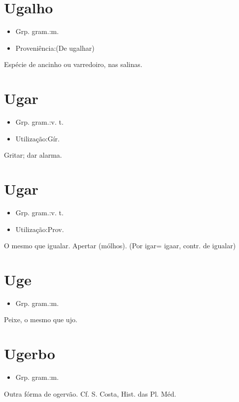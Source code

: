 \documentclass{article}
\begin{document}
\section{Ugalho}
\begin{itemize}
\item {Grp. gram.:m.}
\end{itemize}
\begin{itemize}
\item {Proveniência:(De \textunderscore ugalhar\textunderscore )}
\end{itemize}
Espécie de ancinho ou varredoiro, nas salinas.
\section{Ugar}
\begin{itemize}
\item {Grp. gram.:v. t.}
\end{itemize}
\begin{itemize}
\item {Utilização:Gír.}
\end{itemize}
Gritar; dar alarma.
\section{Ugar}
\begin{itemize}
\item {Grp. gram.:v. t.}
\end{itemize}
\begin{itemize}
\item {Utilização:Prov.}
\end{itemize}
O mesmo que \textunderscore igualar\textunderscore .
Apertar (mólhos).
(Por \textunderscore igar\textunderscore  = \textunderscore igaar\textunderscore , contr. de \textunderscore igualar\textunderscore )
\section{Uge}
\begin{itemize}
\item {Grp. gram.:m.}
\end{itemize}
Peixe, o mesmo que \textunderscore ujo\textunderscore .
\section{Ugerbo}
\begin{itemize}
\item {Grp. gram.:m.}
\end{itemize}
Outra fórma de \textunderscore ogervão\textunderscore . Cf. S. Costa, \textunderscore Hist. das Pl. Méd.\textunderscore 
\end{document}
